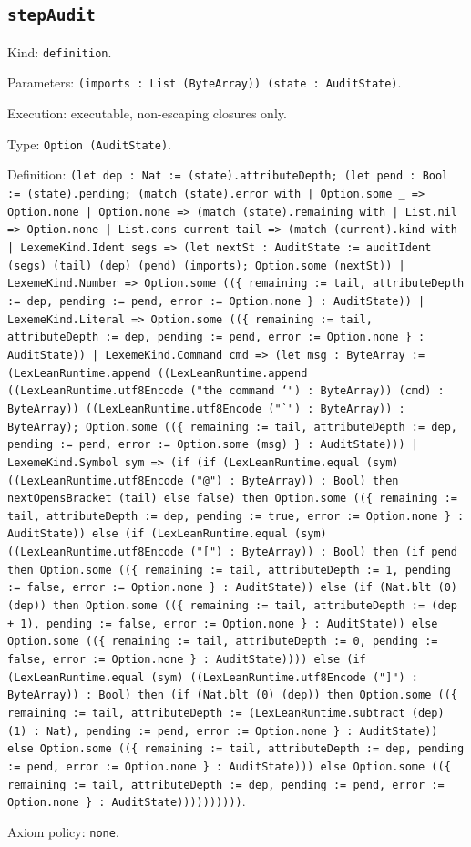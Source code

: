 \documentclass[11pt]{article}
\begin{document}
\subsection*{\texttt{stepAudit}}
\noindent Kind: \texttt{definition}.\par
\noindent Parameters: \texttt{(imports : List (ByteArray)) (state : AuditState)}.\par
\noindent Execution: executable, non-escaping closures only.\par
\noindent Type: \texttt{Option (AuditState)}.\par
\noindent Definition: \texttt{(let dep : Nat := (state).attributeDepth; (let pend : Bool := (state).pending; (match (state).error with | Option.some \_ => Option.none | Option.none => (match (state).remaining with | List.nil => Option.none | List.cons current tail => (match (current).kind with | LexemeKind.Ident segs => (let nextSt : AuditState := auditIdent (segs) (tail) (dep) (pend) (imports); Option.some (nextSt)) | LexemeKind.Number => Option.some ((\{ remaining := tail, attributeDepth := dep, pending := pend, error := Option.none \} : AuditState)) | LexemeKind.Literal => Option.some ((\{ remaining := tail, attributeDepth := dep, pending := pend, error := Option.none \} : AuditState)) | LexemeKind.Command cmd => (let msg : ByteArray := (LexLeanRuntime.append ((LexLeanRuntime.append ((LexLeanRuntime.utf8Encode ("the command `") : ByteArray)) (cmd) : ByteArray)) ((LexLeanRuntime.utf8Encode ("`") : ByteArray)) : ByteArray); Option.some ((\{ remaining := tail, attributeDepth := dep, pending := pend, error := Option.some (msg) \} : AuditState))) | LexemeKind.Symbol sym => (if (if (LexLeanRuntime.equal (sym) ((LexLeanRuntime.utf8Encode ("@") : ByteArray)) : Bool) then nextOpensBracket (tail) else false) then Option.some ((\{ remaining := tail, attributeDepth := dep, pending := true, error := Option.none \} : AuditState)) else (if (LexLeanRuntime.equal (sym) ((LexLeanRuntime.utf8Encode ("[") : ByteArray)) : Bool) then (if pend then Option.some ((\{ remaining := tail, attributeDepth := 1, pending := false, error := Option.none \} : AuditState)) else (if (Nat.blt (0) (dep)) then Option.some ((\{ remaining := tail, attributeDepth := (dep + 1), pending := false, error := Option.none \} : AuditState)) else Option.some ((\{ remaining := tail, attributeDepth := 0, pending := false, error := Option.none \} : AuditState)))) else (if (LexLeanRuntime.equal (sym) ((LexLeanRuntime.utf8Encode ("]") : ByteArray)) : Bool) then (if (Nat.blt (0) (dep)) then Option.some ((\{ remaining := tail, attributeDepth := (LexLeanRuntime.subtract (dep) (1) : Nat), pending := pend, error := Option.none \} : AuditState)) else Option.some ((\{ remaining := tail, attributeDepth := dep, pending := pend, error := Option.none \} : AuditState))) else Option.some ((\{ remaining := tail, attributeDepth := dep, pending := pend, error := Option.none \} : AuditState))))))))))}.\par
\noindent Axiom policy: \texttt{none}.\par
\end{document}
